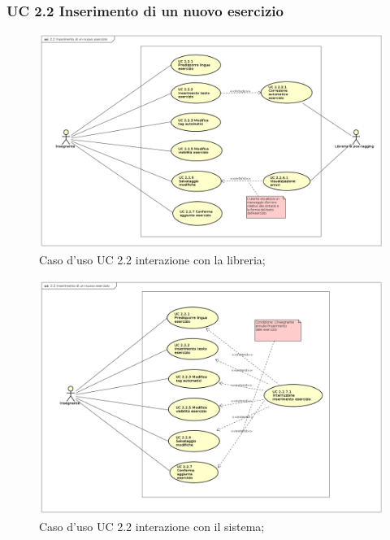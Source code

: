 \subsubsection{UC 2.2 Inserimento di un nuovo esercizio}

\begin{figure}[H]
	\centering
	\includegraphics[width=18cm]{img/UC22LIBRERIA.png} 
	\caption{Caso d'uso UC 2.2 interazione con la libreria;}
\end{figure}


\begin{figure}[H]
	\centering
	\includegraphics[width=18cm]{img/UC22SISTEMA.png} 
	\caption{Caso d'uso UC 2.2 interazione con il sistema;}
\end{figure}

